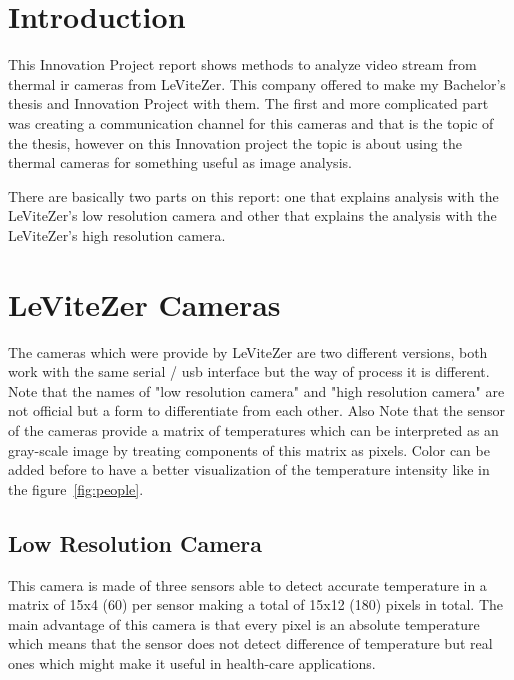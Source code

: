 \documentclass[hidelinks,11pt,a4paper,oneside,article]{memoir}
\begin{document}
\setcounter{page}{1} %
\ClearWallPaper

\sloppy %

\chapter{Introduction}
This Innovation Project report shows methods to analyze video stream from thermal \gls{ir} cameras from LeViteZer. This company offered to make my Bachelor's thesis and Innovation Project with them. The first and more complicated part was creating a communication channel for this cameras and that is the topic of the thesis, however on this Innovation project the topic is about using the thermal cameras for something useful as image analysis.

There are basically two parts on this report: one that explains analysis with the LeViteZer's low resolution camera and other that explains the analysis with the LeViteZer's high resolution camera.

\clearpage	
\chapter{LeViteZer Cameras}\label{sec:theoretical-background}

The cameras which were provide by LeViteZer are two different versions, both work with the same serial / \gls{usb} interface but the way of process it is different. Note that the names of "low resolution camera" and "high resolution camera" are not official but a form to differentiate from each other. Also Note that the sensor of the cameras provide a matrix of temperatures which can be interpreted as an gray-scale image by treating components of this matrix as pixels. Color can be added before to have a better visualization of the temperature intensity like in the figure~\ref{fig:people}.

\section{Low Resolution Camera}
This camera is made of three sensors able to detect accurate temperature in a matrix of 15x4 (60) per sensor making a total of 15x12 (180) pixels in total. The main advantage of this camera is that every pixel is an absolute temperature which means that the sensor does not detect difference of temperature but real ones which might make it useful in health-care applications.
\end{document}
